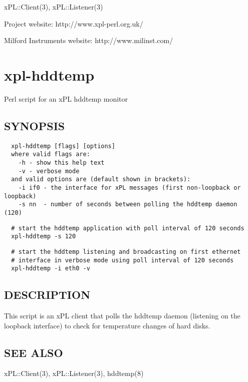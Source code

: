 \documentclass[12pt,a4paper]{article}
\begin{document}
xPL::Client(3), xPL::Listener(3)



Project website: http://www.xpl-perl.org.uk/



Milford Instruments website: http://www.milinst.com/

\newpage
\section{xpl-hddtemp\label{xpl-hddtemp}}


Perl script for an xPL hddtemp monitor

\subsection*{SYNOPSIS\label{xpl-hddtemp_SYNOPSIS}}
\begin{verbatim}
  xpl-hddtemp [flags] [options]
  where valid flags are:
    -h - show this help text
    -v - verbose mode
  and valid options are (default shown in brackets):
    -i if0 - the interface for xPL messages (first non-loopback or loopback)
    -s nn  - number of seconds between polling the hddtemp daemon (120)
\end{verbatim}
\begin{verbatim}
  # start the hddtemp application with poll interval of 120 seconds
  xpl-hddtemp -s 120
\end{verbatim}
\begin{verbatim}
  # start the hddtemp listening and broadcasting on first ethernet
  # interface in verbose mode using poll interval of 120 seconds
  xpl-hddtemp -i eth0 -v
\end{verbatim}
\subsection*{DESCRIPTION\label{xpl-hddtemp_DESCRIPTION}}


This script is an xPL client that polls the hddtemp daemon (listening
on the loopback interface) to check for temperature changes of hard
disks.

\subsection*{SEE ALSO\label{xpl-hddtemp_SEE_ALSO}}


xPL::Client(3), xPL::Listener(3), hddtemp(8)
\end{document}
